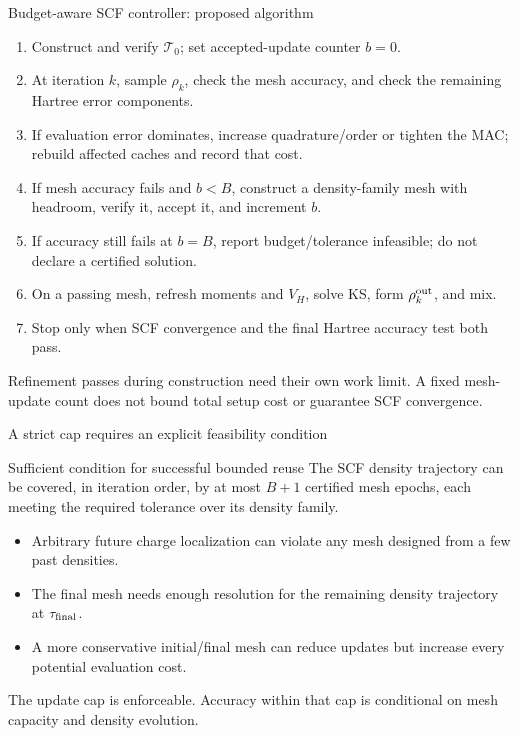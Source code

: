 \documentclass[aspectratio=169,10pt]{beamer}
\begin{document}
\begin{frame}{Budget-aware SCF controller: proposed algorithm}
\small
\begin{enumerate}
\item Construct and verify $\mathcal T_0$; set accepted-update counter $b=0$.
\item At iteration $k$, sample $\rho_k$, check the mesh accuracy, and check the remaining Hartree error components.
\item If evaluation error dominates, increase quadrature/order or tighten the MAC; rebuild affected caches and record that cost.
\item If mesh accuracy fails and $b<B$, construct a density-family mesh with headroom, verify it, accept it, and increment $b$.
\item If accuracy still fails at $b=B$, report \alert{budget/tolerance infeasible}; do not declare a certified solution.
\item On a passing mesh, refresh moments and $V_H$, solve KS, form $\rho_k^{\rm out}$, and mix.
\item Stop only when SCF convergence and the final Hartree accuracy test both pass.
\end{enumerate}
\footnotesize Refinement passes during construction need their own work limit. A fixed mesh-update count does not bound total setup cost or guarantee SCF convergence.
\end{frame}

\begin{frame}{A strict cap requires an explicit feasibility condition}
\begin{block}{Sufficient condition for successful bounded reuse}
The SCF density trajectory can be covered, in iteration order, by at most $B+1$ certified mesh epochs, each meeting the required tolerance over its density family.
\end{block}
\begin{itemize}
\item Arbitrary future charge localization can violate any mesh designed from a few past densities.
\item The final mesh needs enough resolution for the remaining density trajectory at $\tau_{\rm final}$.
\item A more conservative initial/final mesh can reduce updates but increase every potential evaluation cost.
\end{itemize}
\medskip
\alert{The update cap is enforceable. Accuracy within that cap is conditional on mesh capacity and density evolution.}
\end{frame}
\end{document}
